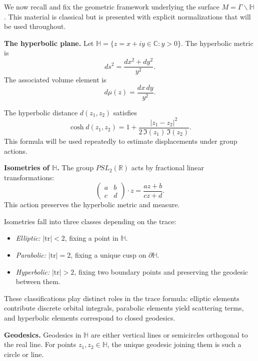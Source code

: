 
\noindent
We now recall and fix the geometric framework underlying the surface
$M=\Gamma\backslash\mathbb{H}$.
This material is classical but is presented with explicit normalizations
that will be used throughout.

\medskip

\noindent\textbf{The hyperbolic plane.}
Let $\mathbb{H}=\{z=x+iy \in \mathbb{C}: y>0\}$.
The hyperbolic metric is
\[
  ds^{2} = \frac{dx^{2}+dy^{2}}{y^{2}}.
\]
The associated volume element is
\[
  d\mu(z) = \frac{dx\,dy}{y^{2}}.
\]

\medskip

\noindent
The hyperbolic distance $d(z_{1},z_{2})$ satisfies
\[
  \cosh d(z_{1},z_{2})
  = 1 + \frac{|z_{1}-z_{2}|^{2}}{2\,\Im(z_{1})\,\Im(z_{2})}.
\]
This formula will be used repeatedly to estimate displacements
under group actions.

\medskip

\noindent\textbf{Isometries of $\mathbb{H}$.}
The group $PSL_{2}(\mathbb{R})$ acts by fractional linear transformations:
\[
  \begin{pmatrix} a & b \\ c & d \end{pmatrix} \cdot z = \frac{az+b}{cz+d}.
\]
This action preserves the hyperbolic metric and measure.

\medskip

\noindent
Isometries fall into three classes depending on the trace:
\begin{itemize}
  \item \emph{Elliptic:} $|\mathrm{tr}|<2$, fixing a point in $\mathbb{H}$.
  \item \emph{Parabolic:} $|\mathrm{tr}|=2$, fixing a unique cusp on $\partial\mathbb{H}$.
  \item \emph{Hyperbolic:} $|\mathrm{tr}|>2$, fixing two boundary points and preserving the geodesic between them.
\end{itemize}
These classifications play distinct roles in the trace formula:
elliptic elements contribute discrete orbital integrals,
parabolic elements yield scattering terms,
and hyperbolic elements correspond to closed geodesics.

\medskip

\noindent\textbf{Geodesics.}
Geodesics in $\mathbb{H}$ are either vertical lines or semicircles orthogonal to the real line.
For points $z_{1},z_{2}\in\mathbb{H}$,
the unique geodesic joining them is such a circle or line.

